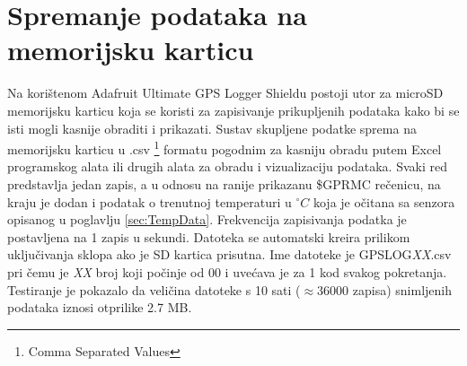 \section{Spremanje podataka na memorijsku karticu}
Na korištenom Adafruit Ultimate GPS Logger Shieldu postoji utor za microSD memorijsku karticu koja se koristi za zapisivanje prikupljenih podataka kako bi se isti mogli kasnije obraditi i prikazati.
Sustav skupljene podatke sprema na memorijsku karticu u .csv \footnote{Comma Separated Values} formatu pogodnim za kasniju obradu putem Excel programskog alata ili drugih alata za obradu i vizualizaciju podataka.
Svaki red predstavlja jedan zapis, a u odnosu na ranije prikazanu \$GPRMC rečenicu, na kraju je dodan i podatak o trenutnoj temperaturi u $^\circ C$ koja je očitana sa senzora opisanog u poglavlju \ref{sec:TempData}.
Frekvencija zapisivanja podatka je postavljena na 1 zapis u sekundi.
Datoteka se automatski kreira prilikom uključivanja sklopa ako je SD kartica prisutna.
Ime datoteke je GPSLOG\textit{XX}.csv pri čemu je \textit{XX} broj koji počinje od 00 i uvećava je za 1 kod svakog pokretanja. 
Testiranje je pokazalo da veličina datoteke s 10 sati ($\approx 36000$ zapisa) snimljenih podataka iznosi otprilike 2.7 MB.
